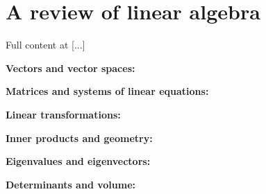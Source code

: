 \chapter{A review of linear algebra}
\label{appendix1}

Full content at [...]

\medskip

\textbf{Vectors and vector spaces:}

\medskip

\textbf{Matrices and systems of linear equations:}

\medskip

\textbf{Linear transformations:}

\medskip

\textbf{Inner products and geometry:}

\medskip

\textbf{Eigenvalues and eigenvectors:}

\medskip

\textbf{Determinants and volume:}
